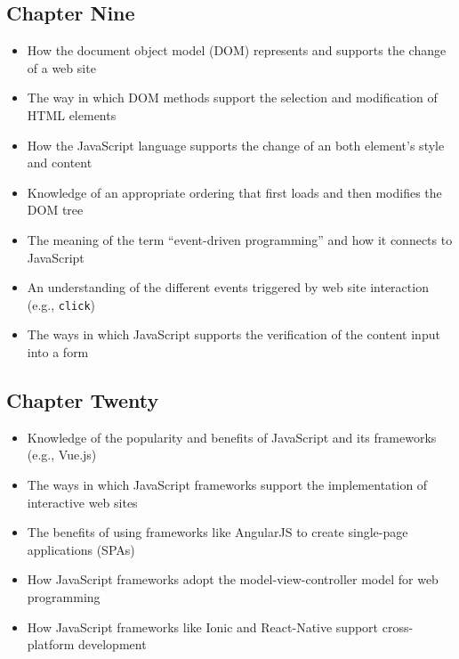 \documentclass[11pt]{article}
\begin{document}
\vspace*{-.2in}
\subsection*{Chapter Nine}

\begin{itemize}


  \item How the document object model (DOM) represents and supports the
    change of a web site

  \item The way in which DOM methods support the selection and modification of
    HTML elements

  \item How the JavaScript language supports the change of an both element's
    style and content

  \item Knowledge of an appropriate ordering that first loads and then modifies
    the DOM tree

  \item The meaning of the term ``event-driven programming'' and how it connects
    to JavaScript

  \item An understanding of the different events triggered by web site
    interaction (e.g., {\tt click})

  \item The ways in which JavaScript supports the verification of the content
    input into a form

\end{itemize}

\vspace*{-.2in}
\subsection*{Chapter Twenty}

\begin{itemize}

  \item Knowledge of the popularity and benefits of JavaScript and its
    frameworks (e.g., Vue.js)

  \item The ways in which JavaScript frameworks support the implementation of
    interactive web sites

  \item The benefits of using frameworks like AngularJS to create single-page
    applications (SPAs)

  \item How JavaScript frameworks adopt the model-view-controller model for
    web programming

  \item How JavaScript frameworks like Ionic and React-Native support
    cross-platform development

\end{itemize}
\end{document}
